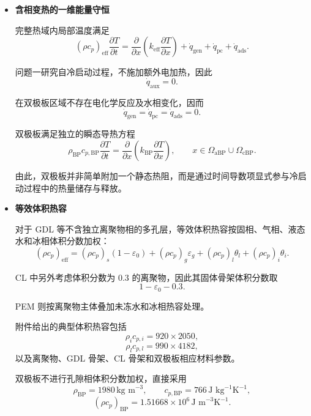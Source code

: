 \documentclass[bwprint]{gmcmthesis}
\numberwithin{figure}{section}
\begin{document}
\begin{itemize}
\renewcommand{\labelitemi}{$\blacktriangleright$}
\item \textbf {含相变热的一维能量守恒}

{\color{red} 完整热域内局部温度满足
\begin{equation}
(\rho c_p)_{\text{eff}} \frac{\partial T}{\partial t} = \frac{\partial}{\partial x} \left( k_{\text{eff}} \frac{\partial T}{\partial x} \right) + \dot{q}_{\text{gen}} + \dot{q}_{\text{pc}} + \dot{q}_{\text{ads}}. \tag{4-56}
\end{equation}}

问题一研究自冷启动过程，不施加额外电加热，因此
\[
\dot{q}_{\text{aux}} = 0.
\]

在双极板区域不存在电化学反应及水相变化，因而
\[
\dot{q}_{\text{gen}} = \dot{q}_{\text{pc}} = \dot{q}_{\text{ads}} = 0.
\]

双极板满足独立的瞬态导热方程
\begin{equation}
\rho_{\text{BP}} c_{p,\text{BP}} \frac{\partial T}{\partial t} = \frac{\partial}{\partial x} \left( k_{\text{BP}} \frac{\partial T}{\partial x} \right), \qquad x \in \Omega_{\text{aBP}} \cup \Omega_{\text{cBP}}. \tag{4-57}
\end{equation}

由此，双极板并非简单附加一个静态热阻，而是通过时间导数项显式参与冷启动过程中的热量储存与释放。

\item \textbf {等效体积热容}

对于 GDL 等不含独立离聚物相的多孔层，等效体积热容按固相、气相、液态水和冰相体积分数加权：
\begin{equation}
(\rho c_p)_{\text{eff}} = (\rho c_p)_s(1 - \varepsilon_0) + (\rho c_p)_g \varepsilon_g + (\rho c_p)_l \theta_l + (\rho c_p)_i \theta_i. \tag{4-58}
\end{equation}

CL 中另外考虑体积分数为 0.3 的离聚物，因此其固体骨架体积分数取
\[
1 - \varepsilon_0 - 0.3.
\]

PEM 则按离聚物主体叠加未冻水和冰相热容处理。

附件给出的典型体积热容包括
\[
\rho_i c_{p,i} = 920 \times 2050,
\]
\[
\rho_l c_{p,l} = 990 \times 4182,
\]
以及离聚物、GDL 骨架、CL 骨架和双极板相应材料参数。

双极板不进行孔隙相体积分数加权，直接采用
\[
\rho_{\text{BP}} = 1980 \, \text{kg m}^{-3}, \qquad c_{p,\text{BP}} = 766 \, \text{J kg}^{-1}\text{K}^{-1},
\]
\begin{equation}
(\rho c_p)_{\text{BP}} = 1.51668 \times 10^6 \, \text{J m}^{-3}\text{K}^{-1}. \tag{4-59}
\end{equation}


\end{itemize}
\end{document}
